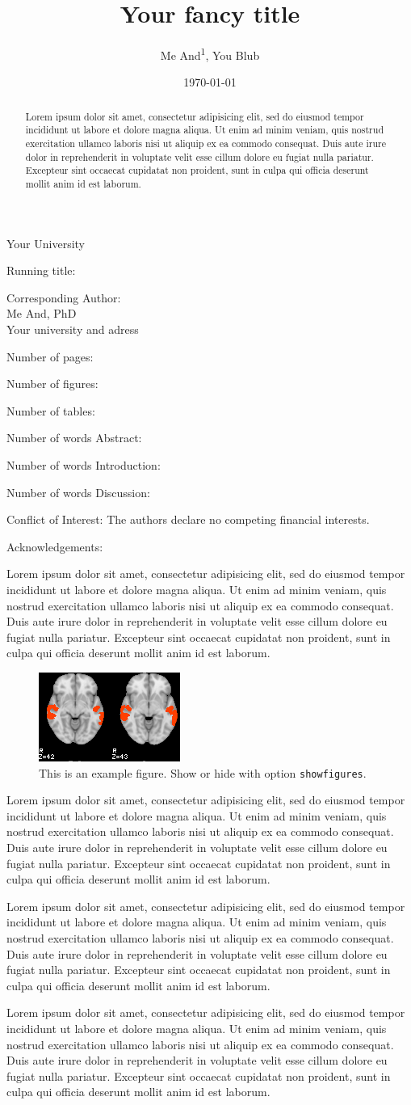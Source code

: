 \documentclass[10pt, %
showfigures %
]{jneurosci}
\title{Your fancy title}
\date{\normalsize\today}
\author{Me And\textsuperscript{1}, You Blub}
\newcommand{\loremipsum}{Lorem ipsum dolor sit amet, consectetur adipisicing elit, sed do eiusmod tempor incididunt ut labore et dolore magna aliqua. Ut enim ad minim veniam, quis nostrud exercitation ullamco laboris nisi ut aliquip ex ea commodo consequat. Duis aute irure dolor in reprehenderit in voluptate velit esse cillum dolore eu fugiat nulla pariatur. Excepteur sint occaecat cupidatat non proident, sunt in culpa qui officia deserunt mollit anim id est laborum.}
\begin{document}
\maketitle
\begin{affiliations}
\item Your University
\end{affiliations}

\begin{frontpage}

  \item[Running title:] 
  \item[Corresponding Author:] ~\\
Me And, PhD\\
Your university and adress\\
\item[Number of pages:]
\item[Number of figures:]
\item[Number of tables:]
\item[Number of words Abstract:]
\item[Number of words Introduction:]
\item[Number of words Discussion:]
\item[Conflict of Interest:] The authors declare no competing financial interests.
\item[Acknowledgements:] 
\end{frontpage}

\begin{abstract}
\loremipsum
\end{abstract}


\begin{introduction}
\loremipsum
\begin{figure}
  \begin{center}
    \includegraphics[width=.5\textwidth]{examplefig}
  \end{center}
  \caption{This is an example figure. Show or hide with option \texttt{showfigures}.}
\end{figure}

\nocite{*}
\end{introduction}

\begin{methods}
\loremipsum
\end{methods}

\begin{results}
\loremipsum
\end{results}


\begin{discussion}
\loremipsum
\end{discussion}


\listoffigures
\end{document}
